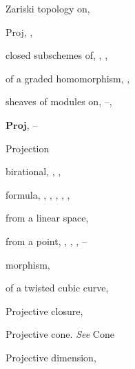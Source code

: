 {{\noindent\hspace*{7.5bp}Zariski topology on, \par
\noindent\hspace*{0.0bp}Proj, , \par
\noindent\hspace*{7.5bp}closed subschemes of, , , \par
\noindent\hspace*{7.5bp}of a graded homomorphism, , \par
\noindent\hspace*{7.5bp}sheaves of modules on, --, \par
\noindent\hspace*{0.0bp}$\mathbf{Proj}$, --\par
\noindent\hspace*{0.0bp}Projection\par
\noindent\hspace*{7.5bp}birational, , , \par
\noindent\hspace*{7.5bp}formula, , , , , , \par
\noindent\hspace*{7.5bp}from a linear space, \par
}\hfill%
\parbox[t]{162.5bp}{\fontsize{8.05}{8.49}\selectfont%
\raggedright\setlength{\parskip}{0pt}%
\noindent\hspace*{7.5bp}from a point, , , , --\par
\noindent\hspace*{7.5bp}morphism, \par
\noindent\hspace*{7.5bp}of a twisted cubic curve, \par
\noindent\hspace*{0.0bp}Projective closure, \par
\noindent\hspace*{0.0bp}Projective cone. \emph{See} Cone\par
\noindent\hspace*{0.0bp}Projective dimension, \par
}}
